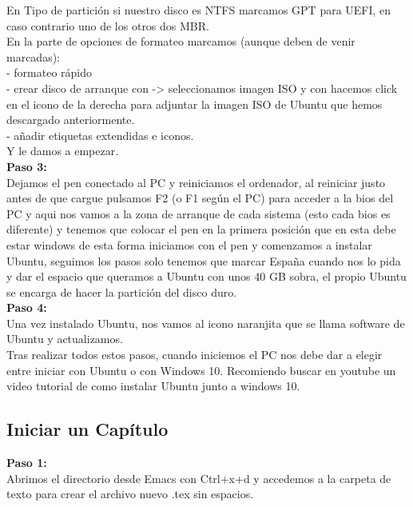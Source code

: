 En Tipo de partición si nuestro disco es NTFS marcamos GPT para UEFI, en caso contrario uno de los otros dos MBR.\\

En la parte de opciones de formateo marcamos (aunque deben de venir marcadas):\\
- formateo rápido\\
- crear disco de arranque con -> seleccionamos imagen ISO y con hacemos click en el icono de la derecha para adjuntar la imagen ISO de Ubuntu que hemos descargado anteriormente.\\
- añadir etiquetas extendidas e iconos.\\

Y le damos a empezar.\\


\textbf{Paso 3:}\\
Dejamos el pen conectado al PC y reiniciamos el ordenador, al reiniciar justo antes de que cargue pulsamos F2 (o F1 según el PC) para acceder a la bios del PC y aqui nos vamos a la zona de arranque de cada sistema (esto cada bios es diferente) y tenemos que colocar el pen en la primera posición que en esta debe estar windows de esta forma iniciamos con el pen y comenzamos a instalar Ubuntu, seguimos los pasos solo tenemos que marcar España cuando nos lo pida y dar el espacio que queramos a Ubuntu con unos 40 GB sobra, el propio Ubuntu se encarga de hacer la partición del disco duro.\\

\textbf{Paso 4:}\\
Una vez instalado Ubuntu, nos vamos al icono naranjita que se llama software de Ubuntu y actualizamos.\\

Tras realizar todos estos pasos, cuando iniciemos el PC nos debe dar a elegir entre iniciar con Ubuntu o con Windows 10. Recomiendo buscar en youtube un video tutorial de como instalar Ubuntu junto a windows 10.\\


 

\subsection{Iniciar un Capítulo}

\textbf{Paso 1:}\\
Abrimos el directorio desde Emacs con Ctrl+x+d y accedemos a la carpeta de texto para crear el archivo nuevo .tex sin espacios.\\

